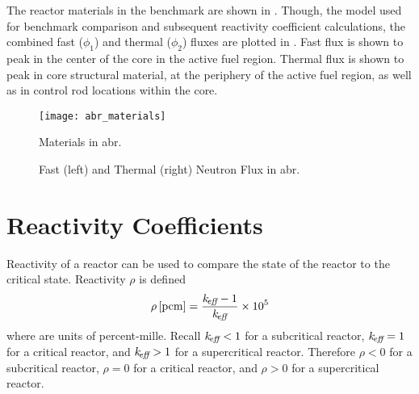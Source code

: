   The reactor materials in the benchmark are shown in . 
  Though, the model used for benchmark comparison and subsequent reactivity
  coefficient calculations, the combined fast ($\phi_1$) and thermal ($\phi_2$)
  fluxes are plotted in . Fast flux is shown to peak in
  the center of the core in the active fuel region. Thermal flux is shown to
  peak in core structural material, at the periphery of the active fuel region,
  as well as in control rod locations within the core.


  \begin{figure}
    \centering
    \texttt{[image: abr\_materials]}
    \caption{Materials in \gls{abr}.}
    \label{fig:abr_materials}
  \end{figure}

  \begin{figure}
    \centering
    \hspace{0.2in}
    \caption{Fast (left) and Thermal (right) Neutron Flux in \gls{abr}.}
    \label{fig:abr_fluxes}
  \end{figure}

\section{Reactivity Coefficients}
\label{sec:reactivity_coefficients}
  Reactivity of a reactor can be used to compare the state of the reactor to the
  critical state. Reactivity $\rho$ is defined
  \begin{equation}
    \label{eq:reactivity}
    \rho \left[\text{{pcm}}\right] = \frac{k_{\!\mbox{\scriptsize \em eff}}-1}{k_{\!\mbox{\scriptsize \em eff}}} \times 10^5
  \end{equation}
  where  are units of percent-mille.
  Recall $k_{\!\mbox{\scriptsize \em eff}} < 1$ for a subcritical reactor, $k_{\!\mbox{\scriptsize \em eff}}=1$ for a critical
  reactor, and $k_{\!\mbox{\scriptsize \em eff}} > 1$ for a supercritical reactor. Therefore $\rho < 0$
  for a subcritical reactor, $\rho = 0$ for a critical reactor, and $\rho > 0$
  for a supercritical reactor. 


